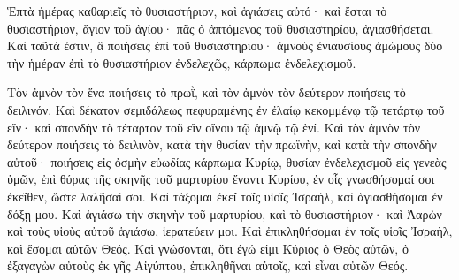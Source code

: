 {Ἑπτὰ ἡμέρας καθαριεῖς τὸ θυσιαστήριον, καὶ ἁγιάσεις αὐτό· καὶ ἔσται τὸ θυσιαστήριον, ἅγιον τοῦ ἁγίου· πᾶς ὁ ἁπτόμενος τοῦ θυσιαστηρίου, ἁγιασθήσεται.
Καὶ ταῦτά ἐστιν, ἃ ποιήσεις ἐπὶ τοῦ θυσιαστηρίου· ἀμνοὺς ἐνιαυσίους ἀμώμους δύο τὴν ἡμέραν ἐπὶ τὸ θυσιαστήριον ἐνδελεχῶς, κάρπωμα ἐνδελεχισμοῦ.
\par }{\PP {}Τὸν ἀμνὸν τὸν ἕνα ποιήσεις τὸ πρωῒ, καὶ τὸν ἀμνὸν τὸν δεύτερον ποιήσεις τὸ δειλινόν.
Καὶ δέκατον σεμιδάλεως πεφυραμένης ἐν ἐλαίῳ κεκομμένῳ τῷ τετάρτῳ τοῦ εἴν· καὶ σπονδὴν τὸ τέταρτον τοῦ εἲν οἴνου τῷ ἀμνῷ τῷ ἑνί.
Καὶ τὸν ἀμνὸν τὸν δεύτερον ποιήσεις τὸ δειλινὸν, κατὰ τὴν θυσίαν τὴν πρωϊνὴν, καὶ κατὰ τὴν σπονδὴν αὐτοῦ· ποιήσεις εἰς ὀσμὴν εὐωδίας κάρπωμα Κυρίῳ,
θυσίαν ἐνδελεχισμοῦ εἰς γενεὰς ὑμῶν, ἐπὶ θύρας τῆς σκηνῆς τοῦ μαρτυρίου ἔναντι Κυρίου, ἐν οἷς γνωσθήσομαί σοι ἐκεῖθεν, ὥστε λαλῆσαί σοι.
Καὶ τάξομαι ἐκεῖ τοῖς υἱοῖς Ἰσραὴλ, καὶ ἁγιασθήσομαι ἐν δόξῃ μου.
Καὶ ἁγιάσω τὴν σκηνὴν τοῦ μαρτυρίου, καὶ τὸ θυσιαστήριον· καὶ Ἀαρὼν καὶ τοὺς υἱοὺς αὐτοῦ ἁγιάσω, ἱερατεύειν μοι.
Καὶ ἐπικληθήσομαι ἐν τοῖς υἱοῖς Ἰσραὴλ, καὶ ἔσομαι αὐτῶν Θεός.
Καὶ γνώσονται, ὅτι ἐγώ εἰμι Κύριος ὁ Θεὸς αὐτῶν, ὁ ἐξαγαγὼν αὐτοὺς ἐκ γῆς Αἰγύπτου, ἐπικληθῆναι αὐτοῖς, καὶ εἶναι αὐτῶν Θεός.

}
